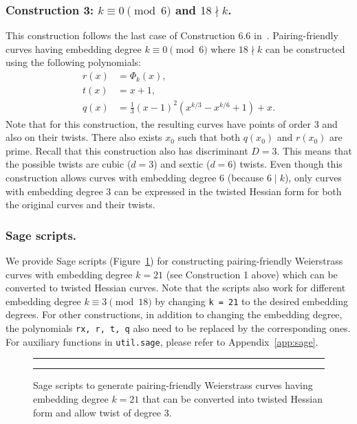 
\subsubsection{Construction 3: $k \equiv 0 \pmod{6}$ and $18 \nmid k$.}
\label{con3}

This construction follows the last case of {Construction 6.6} in~\cite{2010/freeman}.
Pairing-friendly curves having embedding degree $k \equiv 0 \pmod{6}$ where $18 \nmid k$
can be constructed using the following polynomials:
\begin{align*}
r(x) &= \Phi_k(x),	\\
t(x) &= x+1,		\\
q(x) &= \frac{1}{3} (x-1)^2 (x^{k/3} - x^{k/6} + 1) + x.
\end{align*}
Note that for this construction,
the resulting curves have points of order 3 and also on their twists.
There also exists $x_0$ such that both $q(x_0)$ and $r(x_0)$ are prime.
Recall that this construction also has discriminant $D = 3$.
This means that the possible twists are  cubic ($d=3$) and sextic ($d=6$) twists.
Even though this construction allows curves with embedding degree $6$ (because $6 \mid k$),
only curves with embedding degree $3$ can be expressed in the twisted Hessian form
for both the original curves and their twists.


\subsubsection{Sage scripts.}
We provide Sage scripts (Figure~\ref{fig:sscript})
for constructing pairing-friendly Weierstrass curves with embedding degree $k = 21$
(see Construction 1 above)
which can be converted to twisted Hessian curves.
Note that the scripts also work for different embedding degree $k \equiv 3 \pmod{18}$ 
by changing \texttt{k = 21} to the desired embedding degrees.
For other constructions,
in addition to changing the embedding degree,
the polynomials \texttt{rx, r, t, q} also need to be replaced by the corresponding ones.
For auxiliary functions in \texttt{util.sage}, please refer to Appendix~\ref{app:sage}.

\begin{figure}
\hrule\medskip
{}
\hrule
\caption{Sage scripts to generate pairing-friendly Weierstrass curves having embedding degree $k = 21$
that can be converted into twisted Hessian form and allow twist of degree 3.}
\label{fig:sscript}
\end{figure}

